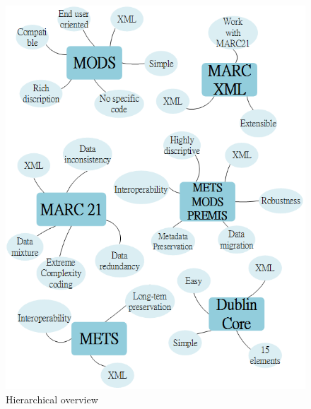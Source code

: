 	
	\begin{figure}[h]
		\begin{center}
			\includegraphics[scale=0.5]{Eagle_unit.png}
		\end{center}
		\caption{Hierarchical overview}
	\end{figure}
	
	\clearpage %





